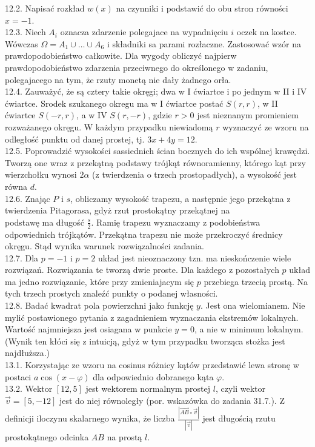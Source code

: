 \documentclass[10pt]{article}
\begin{document}
12.2. Napisać rozkład $w(x)$ na czynniki i podstawić do obu stron równości $x=-1$.\\
12.3. Niech $A_{i}$ oznacza zdarzenie polegajace na wypadnięciu $i$ oczek na kostce. Wówczas $\Omega=A_{1} \cup \ldots \cup A_{6}$ i składniki sa parami rozłaczne. Zastosować wzór na prawdopodobieństwo całkowite. Dla wygody obliczyć najpierw prawdopodobieństwo zdarzenia przeciwnego do określonego w zadaniu, polegajacego na tym, że rzuty monetą nie dały żadnego orła.\\
12.4. Zauważyć, że są cztery takie okręgi; dwa w I ćwiartce i po jednym w II i IV ćwiartce. Srodek szukanego okregu ma w I ćwiartce postać $S(r, r)$, w II ćwiartce $S(-r, r)$, a w IV $S(r,-r)$, gdzie $r>0$ jest nieznanym promieniem rozważanego okręgu. W każdym przypadku niewiadomą $r$ wyznaczyć ze wzoru na odległość punktu od danej prostej, tj. $3 x+4 y=12$.\\
12.5. Poprowadzić wysokości sassiednich ścian bocznych do ich wspólnej krawędzi. Tworzą one wraz z przekątną podstawy trójkąt równoramienny, którego kąt przy wierzchołku wynosi $2 \alpha$ (z twierdzenia o trzech prostopadłych), a wysokość jest równa $d$.\\
12.6. Znając $P$ i $s$, obliczamy wysokość trapezu, a następnie jego przekątna z twierdzenia Pitagorasa, gdyż rzut prostokątny przekątnej na\\
podstawę ma długość $\frac{s}{2}$. Ramię trapezu wyznaczamy z podobieństwa odpowiednich trójkątów. Przekątna trapezu nie może przekroczyć średnicy okręgu. Stąd wynika warunek rozwiązalności zadania.\\
12.7. Dla $p=-1$ i $p=2$ układ jest nieoznaczony tzn. ma nieskończenie wiele rozwiązań. Rozwiązania te tworzą dwie proste. Dla każdego z pozostałych $p$ układ ma jedno rozwiązanie, które przy zmieniajacym się $p$ przebiega trzecią prostą. Na tych trzech prostych znaleźć punkty o podanej własności.\\
12.8. Badać kwadrat pola powierzchni jako funkcję $y$. Jest ona wielomianem. Nie mylić postawionego pytania z zagadnieniem wyznaczania ekstremów lokalnych. Wartość najmniejsza jest osiagana w punkcie $y=0$, a nie w minimum lokalnym. (Wynik ten kłóci się z intuicją, gdyż w tym przypadku tworząca stożka jest najdłuższa.)\\
13.1. Korzystając ze wzoru na cosinus różnicy kątów przedstawić lewa stronę w postaci $a \cos (x-\varphi)$ dla odpowiednio dobranego kąta $\varphi$.\\
13.2. Wektor $[12,5]$ jest wektorem normalnym prostej $l$, czyli wektor $\vec{v}=[5,-12]$ jest do niej równoległy (por. wskazówka do zadania 31.7.). Z definicji iloczynu skalarnego wynika, że liczba $\frac{|\overrightarrow{A B} \circ \vec{v}|}{|\vec{v}|}$ jest długością rzutu prostokątnego odcinka $A B$ na prostą $l$.\\
\end{document}
